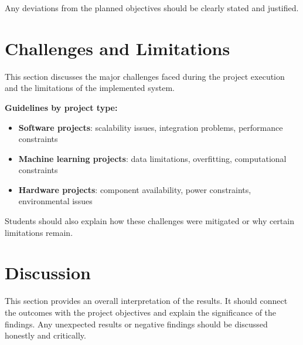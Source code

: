Any deviations from the planned objectives should be clearly stated and justified.

\section{Challenges and Limitations}
This section discusses the major challenges faced during the project execution and the limitations of the implemented system.

\textbf{Guidelines by project type:}
\begin{itemize}
    \item \textbf{Software projects}: scalability issues, integration problems, performance constraints
    \item \textbf{Machine learning projects}: data limitations, overfitting, computational constraints
    \item \textbf{Hardware projects}: component availability, power constraints, environmental issues
\end{itemize}

Students should also explain how these challenges were mitigated or why certain limitations remain.

\section{Discussion}
This section provides an overall interpretation of the results. It should connect the outcomes with the project objectives and explain the significance of the findings. Any unexpected results or negative findings should be discussed honestly and critically.

